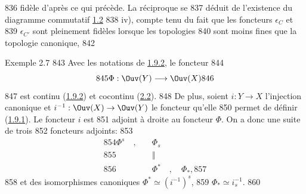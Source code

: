    836	fidèle d'après ce qui précède. La réciproque se
   837	déduit de l'existence du diagramme commutatif \hyperref[III.prop1.2]{1.2}
   838	iv), compte tenu du fait que les foncteurs $\epsilon_C$ et
   839	$\epsilon_{C'}$ sont pleinement fidèles lorsque les topologies
   840	sont moins fines que la topologie canonique, 	
   842	\begin{enonce*}[remark]{Exemple 2.7}
   843	Avec les notations de \hyperref[III.exem1.9.2]{1.9.2}, le foncteur
   844	$$
   845	\Phi:\Ouv(Y)\longrightarrow \Ouv(X)
   846	$$
   847	est continu (\hyperref[III.exem1.9.2]{1.9.2}) et cocontinu (\hyperref[III.prop2.2]{2.2}).
   848	De plus, soient $i:Y\rightarrow X$ l'injection	canonique et $i^{-1}:\Ouv(X)\rightarrow \Ouv(Y)$ le foncteur qu'elle
   850	permet de définir (\hyperref[III.exem1.9.1]{1.9.1}). Le foncteur $i$ est
   851	adjoint à droite au foncteur $\Phi$. On a donc une suite de trois
   852	foncteurs adjoints:
   853	\begin{align*}
   854	\Phi^s\quad ,\quad & \Phi_s\\
   855	        & ‖\\
   856	        &\Phi^{\ast}\quad,\quad \Phi_{\ast},
   857	\end{align*}
   858	et des isomorphismes canoniques $\Phi^{\ast}\simeq (i^{-1})^s$,
   859	$\Phi_{\ast}\simeq i^{-1}_s$.
   860	\end{enonce*}
